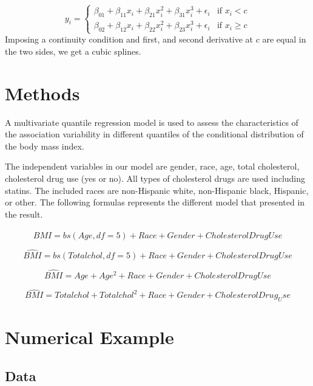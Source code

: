 \documentclass[
  12pt,
]{article}
\begin{document}
\begin{equation}
y_{i}=  
 \left\{
\begin{array}{ll}
 \beta_{01}+\beta_{11}x_i+\beta_{21}x_i^2+ \beta_{31}x_i^3+ \epsilon_i & \mbox{if } x_i< c \\
 \beta_{02}+\beta_{12}x_i+\beta_{22}x_i^2+ \beta_{23}x_i^3+ \epsilon_i& \mbox{if } x_i \geq c
\end{array}
\right.
\end{equation}
Imposing a continuity condition and first, and second derivative at \(c\) are equal in the two sides, we get a cubic splines.

\section{Methods}

A multivariate quantile regression model is used to assess the characteristics of the association variability in different quantiles of the conditional distribution of the body mass index.

The independent variables in our model are gender, race, age, total cholesterol, cholesterol drug use (yes or no). All types of cholesterol drugs are used including statins. The included races are non-Hispanic white, non-Hispanic black, Hispanic, or other. The following formulas represents the different model that presented in the result.

\begin{equation}
 \hat{BMI}= bs(Age, df = 5) + Race + Gender + Cholesterol Drug Use
 \end{equation}

\begin{equation}
 \hat{BMI}= bs(Total chol, df=5)+ Race + Gender + Cholesterol Drug Use
 \end{equation}

\begin{equation}
 \hat{BMI}= Age+Age^2+ Race + Gender + Cholesterol Drug Use 
 \end{equation}

\begin{equation}
 \hat{BMI}= Total chol+ Total chol^2+ Race + Gender + Cholesterol Drug_Use
 \end{equation}

\section{Numerical Example}
\subsection{Data}
\end{document}
